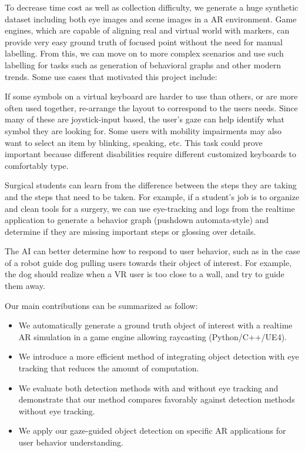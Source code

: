To decrease time cost as well as collection difficulty, we generate a huge synthetic dataset including both eye images and scene images in a AR environment. Game engines, which are capable of aligning real and virtual world with markers, can provide very easy ground truth of focused point without the need for manual labelling. From this, we can move on to more complex scenarios and use such labelling for tasks such as generation of behavioral graphs and other modern trends. Some use cases that motivated this project include: \vspace{-1em}
\begin{description}[noitemsep]
    \item[Adaptive Impaired-user Keyboards] If some symbols on a virtual keyboard are harder to use than others, or are more often used together, re-arrange the layout to correspond to the users needs. Since many of these are joystick-input based, the user's gaze can help identify what symbol they are looking for. Some users with mobility impairments may also want to select an item by blinking, speaking, etc. This task could prove important because different disabilities require different customized keyboards to comfortably type.
    \item[Surgical Training] Surgical students can learn from the difference between the steps they are taking and the steps that need to be taken. For example, if a student's job is to organize and clean tools for a surgery, we can use eye-tracking and logs from the realtime application to generate a behavior graph (pushdown automata-style) and determine if they are missing important steps or glossing over details.
    \item[Dynamic Robot AI] The AI can better determine how to respond to user behavior, such as in the case of a robot guide dog pulling users towards their object of interest. For example, the dog should realize when a VR user is too close to a wall, and try to guide them away.
\end{description}

Our main contributions can be summarized as follow:
\begin{itemize}[leftmargin=*,noitemsep]
    \item We automatically generate a ground truth object of interest with a realtime AR simulation in a game engine allowing raycasting (Python/C++/UE4).
    \item We introduce a more efficient method of integrating object detection with eye tracking that reduces the amount of computation.
    \item We evaluate both detection methods with and without eye tracking and demonstrate that our method compares favorably against detection methods without eye tracking.
    \item We apply our gaze-guided object detection on specific AR applications for user behavior understanding.
\end{itemize}




